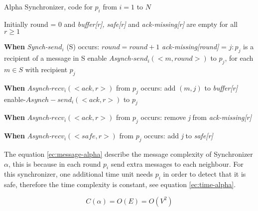 \begin{algorithm}
 \caption{Alpha Synchronizer, code for $p_i$ from $i = 1$ to $N$}
 \label{algorithm:alpha} 

\SetAlgoNoLine

Initially round = 0 and \newline
\textit{buffer[r], safe[r]} and \textit{ack-missing[r]} are empty for all $r \geq 1$ \newline

\textbf{When} \textit{Synch-}$send_i$ (S) occurs:\newline
$round = round + 1$ \newline
\textit{ack-missing[round]} = {$j:p_j$ is a recipient of a message in S} \newline
enable \textit{Asynch-}$send_i(<m,round>)$  to $p_j$, for each $m \in S$ with recipient $p_j$ \newline

\textbf{When} \textit{Asynch-}$recv_i(<ack,r>)$ from $p_j$ occurs: \newline
add $(m,j)$ to \textit{buffer[r]} \newline
enable-$Asynch-send_i(<ack,r>)$ to $p_j$ \newline

\textbf{When} \textit{Asynch-}$recv_i(<ack,r>)$ from $p_j$ occurs: \newline
remove \textit{j} from \textit{ack-missing[r]} \newline
{}

\textbf{When} \textit{Asynch-}$recv_i(<safe,r>)$ from $p_j$ occurs: \newline
add \textit{j} to \textit{safe[r]} \newline
{}

\end{algorithm}


The equation \ref{ec:message-alpha} describe the message complexity of Synchronizer $\alpha$, this is because in each round $p_i$ send extra messages to each neighbour. For this synchronizer, one additional time unit needs $p_i$ in order to detect that it is safe, therefore the time complexity is constant, see equation \ref{ec:time-alpha}. 


\begin{equation}
\label{ec:message-alpha}
 C(\alpha) = O(E) = O(V^2) 
\end{equation}

